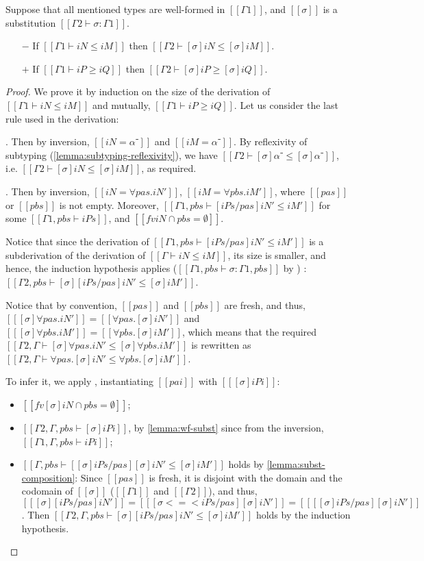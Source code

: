 \begin{lemma}
  \label{lemma:subst-pres-subt}
  Suppose that all mentioned types are well-formed in $[[Γ1]]$,
  and $[[σ]]$ is a substitution $[[Γ2 ⊢ σ : Γ1]]$.
  \begin{itemize}
    \item [$-$] If $[[Γ1 ⊢ iN ≤ iM]]$ then $[[Γ2 ⊢ [σ]iN ≤ [σ]iM]]$.
    \item [$+$] If $[[Γ1 ⊢ iP ≥ iQ]]$ then $[[Γ2 ⊢ [σ]iP ≥ [σ]iQ]]$.
  \end{itemize}
\end{lemma}
\begin{proof}
  We prove it by induction on the size of the derivation of $[[Γ1 ⊢ iN ≤ iM]]$
  and mutually, $[[Γ1 ⊢ iP ≥ iQ]]$. Let us consider the last rule 
  used in the derivation:
  \begin{caseof}
    \item {}. Then by inversion, 
      $[[iN = α⁻]]$ and $[[iM = α⁻]]$. By reflexivity of subtyping
      (\cref{lemma:subtyping-reflexivity}),
      we have $[[Γ2 ⊢ [σ]α⁻ ≤ [σ]α⁻]]$, i.e. $[[Γ2 ⊢ [σ]iN ≤ [σ]iM]]$,
      as required.
    \item  {}. Then by inversion,
      $[[iN = ∀pas.iN']]$, $[[iM = ∀pbs.iM']]$, where $[[pas]]$ or $[[pbs]]$ is not empty.
      Moreover, $[[Γ1, pbs ⊢ [iPs/pas]iN' ≤ iM']]$ for some $[[Γ1, pbs ⊢ iPs]]$, and 
      $[[fv iN ∩ {pbs} = ∅ ]]$.

      Notice that since the derivation of $[[Γ1, pbs ⊢ [iPs/pas]iN' ≤ iM']]$ is
      a subderivation of the derivation of $[[Γ ⊢ iN ≤ iM]]$, its size is smaller, 
      and hence, the induction hypothesis applies
      ($[[Γ1, pbs ⊢ σ : Γ1, pbs]]$ by  \label{lemma:subst-domain-weakening})
      :
      $[[Γ2, pbs ⊢ [σ][iPs/pas]iN' ≤ [σ]iM']]$.

      Notice that by convention, $[[pas]]$ and $[[pbs]]$ are fresh, and thus,  
      $[[ [σ]∀pas.iN' ]] = [[ ∀pas.[σ]iN' ]]$ and $[[ [σ]∀pbs.iM' ]] = [[ ∀pbs.[σ]iM' ]]$, 
      which means that the required $[[Γ2, Γ ⊢ [σ]∀pas.iN' ≤ [σ]∀pbs.iM']]$ is rewritten as
      $[[Γ2 , Γ ⊢ ∀pas.[σ]iN' ≤ ∀pbs.[σ]iM']]$.

      To infer it, we apply , 
      instantiating $[[pai]]$ with $[[ [σ]iPi ]]$:
      \begin{itemize}
        \item $[[fv [σ]iN ∩ {pbs} = ∅ ]]$;
        \item $[[Γ2, Γ,pbs⊢ [σ]iPi]]$, by \cref{lemma:wf-subst} since from the inversion,
          $[[Γ1, Γ, pbs ⊢ iPi]]$;
        \item $[[Γ, pbs ⊢ [ [σ]iPs/pas ][σ]iN' ≤ [σ]iM']]$ holds
          by \cref{lemma:subst-composition}:
          Since $[[pas]]$ is fresh, it is disjoint with the domain and the codomain of $[[σ]]$
          ($[[Γ1]]$ and $[[Γ2]]$), and thus, 
          $[[ [σ][iPs/pas]iN' ]] = [[ [ σ <=< iPs/pas ][σ]iN' ]] = [[ [ [σ]iPs/pas ][σ]iN' ]]$.
          Then $[[Γ2, Γ, pbs ⊢ [σ][iPs/pas]iN' ≤ [σ]iM']]$ holds by the induction hypothesis.
      \end{itemize}


\end{caseof}
\end{proof}
